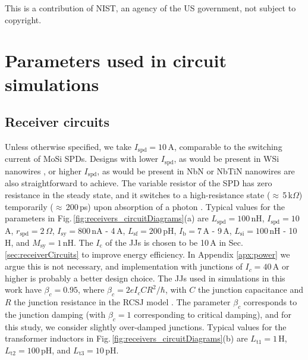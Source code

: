 \documentclass[aip,amsmath,amssymb,reprint,nofootinbib]{revtex4-1}
\begin{document}
\vspace{0.5em}
This is a contribution of NIST, an agency of the US government, not subject to copyright.
	
\newpage
\appendix
	
\section{\label{apx:circuitParameters}Parameters used in circuit simulations}
\subsection{Receiver circuits}
Unless otherwise specified, we take $I_{\mathrm{spd}} = 10$\,\textmu A, comparable to the switching current of MoSi \cite{veko2015} SPDs. Designs with lower $I_{\mathrm{spd}}$, as would be present in WSi nanowires \cite{mave2013}, or higher $I_{\mathrm{spd}}$, as would be present in NbN \cite{gook2001} or NbTiN \cite{miya2013} nanowires are also straightforward to achieve. The variable resistor of the SPD has zero resistance in the steady state, and it switches to a high-resistance state ($\approx$\,5\,k$\Omega$) temporarily ($\approx$\,200\,ps) upon absorption of a photon \cite{yake2007}. Typical values for the parameters in Fig.\,\ref{fig:receivers_circuitDiagrams}(a) are $L_{\mathrm{spd}} = 100$\,nH, $I_{\mathrm{spd}} = 10$\,\textmu A, $r_{\mathrm{spd}} = 2$\,$\Omega$, $I_{\mathrm{sy}} = 800$\,nA -  4\,\textmu A, $L_{\mathrm{sf}} = 200$\,pH, $I_{\mathrm{b}} = 7$\,\textmu A - 9\,\textmu A, $L_{\mathrm{si}} = 100$\,nH - 10\,\textmu H, and $M_{\mathrm{sy}} = 1$\,nH. The $I_{\mathrm{c}}$ of the JJs is chosen to be 10\,\textmu A in Sec.\,\ref{sec:receiverCircuits} to improve energy efficiency. In Appendix \ref{apx:power} we argue this is not necessary, and implementation with junctions of $I_c = 40$\,\textmu A or higher is probably a better design choice. The JJs used in simulations in this work have $\beta_c = 0.95$, where $\beta_c = 2eI_cCR^2/\hbar$, with $C$ the junction capacitance and $R$ the junction resistance in the RCSJ model \cite{vatu1998,ka1999}. The parameter $\beta_c$ corresponds to the junction damping (with $\beta_c = 1$ corresponding to critical damping), and for this study, we consider slightly over-damped junctions. Typical values for the transformer inductors in Fig.\,\ref{fig:receivers_circuitDiagrams}(b) are $L_{\mathrm{t1}} = 1$\,\textmu H, $L_{\mathrm{t2}} = 100$\,pH, and $L_{\mathrm{t3}} = 10$\,pH.
\end{document}
